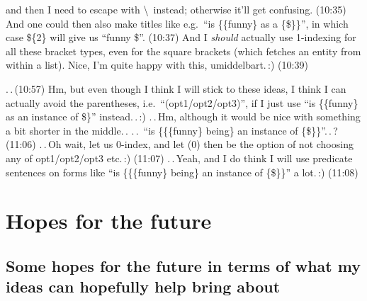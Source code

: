 \documentclass{report}
\begin{document}
and then I need to escape with \textbackslash\ instead; otherwise it'll get confusing. (10:35) And one could then also make titles like e.g.\ ``is \{\{funny\} as a \{\$\}\}'', in which case \$\{2\} will give us ``funny \$''. (10:37) And I \emph{should} actually use 1-indexing for all these bracket types, even for the square brackets (which fetches an entity from within a list). Nice, I'm quite happy with this, umiddelbart.\,:) (10:39)

.\,.\,(10:57) Hm, but even though I think I will stick to these ideas, I think I can actually avoid the parentheses, i.e.\ ``(opt1/opt2/opt3)'', if I just use ``is \{\{funny\} as an instance of \$\}'' instead.\,.\,:) .\,.\,Hm, although it would be nice with something a bit shorter in the middle.\,. .\,.\, ``is \{\{\{funny\} being\} an instance of \{\$\}\}''.\,.\,? (11:06) .\,.\,Oh wait, let us 0-index, and let (0) then be the option of not choosing any of opt1/opt2/opt3 etc.\,:) (11:07) .\,.\,Yeah, and I do think I will use predicate sentences on forms like ``is \{\{\{funny\} being\} an instance of \{\$\}\}'' a lot.\,:) (11:08)
















\chapter{Hopes for the future}

\section{Some hopes for the future in terms of what my ideas can hopefully help bring about}
\label{Some_hopes_in_terms_of_my_ideas}
\end{document}
